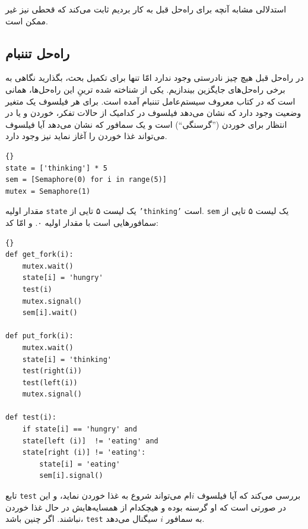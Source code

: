\documentclass{book}
\newcommand{\clearemptydoublepage}{\newpage\cleardoublepage}
\begin{document}
    استدلالی مشابه آنچه برای راه‌حل قبل به کار بردیم ثابت می‌کند که قحطی نیز غیر ممکن است. 


\clearemptydoublepage
\subsection{راه‌حل تننبام}

    در راه‌حل قبل هیچ چیز نادرستی وجود ندارد امّا تنها برای تکمیل بحث، بگذارید نگاهی به برخی راه‌حل‌های جایگزین بیندازیم. 
    یکی از شناخته‌ شده ترینِ  این راه‌حل‌ها، همانی است که در کتاب معروف سیستم‌عامل تننبام آمده است\cite{tanenbaum}. 
    برای هر فیلسوف یک متغیر وضعیت وجود دارد که نشان می‌دهد فیلسوف در کدامیک از حالات تفکر، 
    خوردن و یا در انتظار برای خوردن (''گرسنگی``) است و 
    یک سمافور که نشان می‌دهد آیا فیلسوف می‌تواند غذا خوردن را آغاز نماید نیز وجود دارد. 

\begin{latin}
\begin{lstlisting}[title=\rl{متغیرهای راه‌حل تننبام}]{}
state = ['thinking'] * 5
sem = [Semaphore(0) for i in range(5)]
mutex = Semaphore(1)
\end{lstlisting}
\end{latin}

    مقدار اولیه {\tt state} یک لیست ۵ تایی از {\tt 'thinking'} است.     {\tt sem}
    یک لیست ۵ تایی از سمافورهایی است با مقدار اولیه ۰. 
    و امّا کد: 

\begin{latin}
\begin{lstlisting}[title=\rl{ راه‌حل تننبام}]{}
def get_fork(i):
    mutex.wait()
    state[i] = 'hungry'
    test(i)
    mutex.signal()
    sem[i].wait()

def put_fork(i):
    mutex.wait()
    state[i] = 'thinking'
    test(right(i))
    test(left(i))
    mutex.signal()

def test(i):
    if state[i] == 'hungry' and
    state[left (i)]  != 'eating' and
    state[right (i)] != 'eating':
        state[i] = 'eating'
        sem[i].signal()
\end{lstlisting}
\end{latin}


    تابع {\tt test}  بررسی می‌کند که آیا فیلسوف $i$ام می‌تواند شروع به غذا خوردن نماید، و این در صورتی است که 
    او گرسنه بوده و هیچکدام از همسایه‌هایش در حال غذا خوردن نباشند. اگر چنین باشد، {\tt test} به سمافور $i$ سیگنال می‌دهد. 
    
\end{document}
